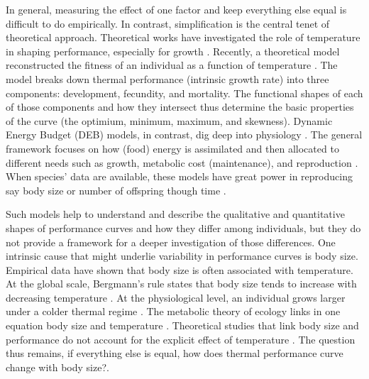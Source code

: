 In general, measuring the effect of one factor and keep everything else equal  is difficult to do empirically.
In contrast, simplification is the central tenet of theoretical approach.
Theoretical works have investigated the role of temperature in shaping performance, especially for growth \citep{VandH1996, Kozlowski2004}.
Recently, a theoretical model reconstructed the fitness of an individual as a function of temperature \citep{Amarasekare2012}.
The model  breaks down thermal performance (intrinsic growth rate)  into three components: development, fecundity, and mortality.
The functional shapes of each of those components and how they intersect thus determine the basic properties of the curve (the optimium, minimum, maximum, and skewness).
Dynamic Energy Budget (DEB) models, in contrast, dig deep into physiology \citep{Kooijman2009}. %
The general framework focuses on how (food) energy is assimilated and then allocated to different needs such as growth, metabolic cost (maintenance), and reproduction \citep{Kooijman2009}.
When species'  data are available, these models have great power in reproducing say body size or number of offspring though time \citep{Nisbet2000}. 

Such models help to understand and describe the qualitative and quantitative shapes of performance curves and how they differ among individuals, but they do not provide a framework for a deeper investigation of those differences.
One intrinsic cause that might underlie variability in performance curves is body size.
Empirical data have shown that body size is often associated with temperature.  
At the global scale, Bergmann's rule states that body size tends to increase with decreasing temperature \citep{Bergmann1847}.
At the physiological level, an individual grows larger under a colder thermal regime \citep{Van1996}.
The metabolic theory of ecology links in one equation body size and temperature \citep{Gillooly2001}.
Theoretical studies that link body size and performance do not account for the explicit effect of temperature \citep[e.g.,][]{Yodzis1992, Brown1993}.
The question thus remains, if everything else is equal, how does thermal performance curve change with body size?. %

